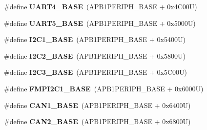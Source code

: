 \begin{DoxyCompactItemize}
\item 
\mbox{\label{group___peripheral__memory__map_ga94d92270bf587ccdc3a37a5bb5d20467}} 
\#define {\bfseries U\+A\+R\+T4\+\_\+\+B\+A\+SE}~(A\+P\+B1\+P\+E\+R\+I\+P\+H\+\_\+\+B\+A\+SE + 0x4\+C00\+U)
\item 
\mbox{\label{group___peripheral__memory__map_gaa155689c0e206e6994951dc3cf31052a}} 
\#define {\bfseries U\+A\+R\+T5\+\_\+\+B\+A\+SE}~(A\+P\+B1\+P\+E\+R\+I\+P\+H\+\_\+\+B\+A\+SE + 0x5000\+U)
\item 
\mbox{\label{group___peripheral__memory__map_gacd72dbffb1738ca87c838545c4eb85a3}} 
\#define {\bfseries I2\+C1\+\_\+\+B\+A\+SE}~(A\+P\+B1\+P\+E\+R\+I\+P\+H\+\_\+\+B\+A\+SE + 0x5400\+U)
\item 
\mbox{\label{group___peripheral__memory__map_ga04bda70f25c795fb79f163b633ad4a5d}} 
\#define {\bfseries I2\+C2\+\_\+\+B\+A\+SE}~(A\+P\+B1\+P\+E\+R\+I\+P\+H\+\_\+\+B\+A\+SE + 0x5800\+U)
\item 
\mbox{\label{group___peripheral__memory__map_ga4e8b9198748235a1729e1e8f8f24983b}} 
\#define {\bfseries I2\+C3\+\_\+\+B\+A\+SE}~(A\+P\+B1\+P\+E\+R\+I\+P\+H\+\_\+\+B\+A\+SE + 0x5\+C00\+U)
\item 
\mbox{\label{group___peripheral__memory__map_gac6e36f905b89086de0fceda4325a9a8e}} 
\#define {\bfseries F\+M\+P\+I2\+C1\+\_\+\+B\+A\+SE}~(A\+P\+B1\+P\+E\+R\+I\+P\+H\+\_\+\+B\+A\+SE + 0x6000\+U)
\item 
\mbox{\label{group___peripheral__memory__map_gad8e45ea6c032d9fce1b0516fff9d8eaa}} 
\#define {\bfseries C\+A\+N1\+\_\+\+B\+A\+SE}~(A\+P\+B1\+P\+E\+R\+I\+P\+H\+\_\+\+B\+A\+SE + 0x6400\+U)
\item 
\mbox{\label{group___peripheral__memory__map_gaf7b8267b0d439f8f3e82f86be4b9fba1}} 
\#define {\bfseries C\+A\+N2\+\_\+\+B\+A\+SE}~(A\+P\+B1\+P\+E\+R\+I\+P\+H\+\_\+\+B\+A\+SE + 0x6800\+U)
\item 
\mbox{\label{group___peripheral__memory__map_gaacb77bc44b3f8c87ab98f241e760e440}} 

\end{DoxyCompactItemize}
